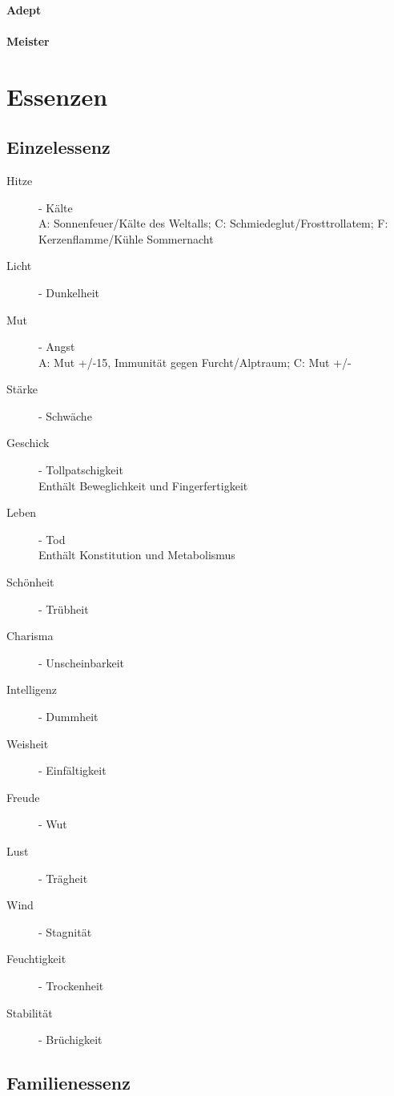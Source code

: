 \documentclass[a4paper,12pt,oneside]{book}
\begin{document}
\subsection{Adept}

\subsection{Meister}

\part{Essenzen}


\chapter{Einzelessenz}

\begin{description}
\item[Hitze] - Kälte
\\A: Sonnenfeuer/Kälte des Weltalls; C: Schmiedeglut/Frosttrollatem; F: Kerzenflamme/Kühle Sommernacht  
\item[Licht] - Dunkelheit
\item[Mut] - Angst
\\A: Mut +/-15, Immunität gegen Furcht/Alptraum; C: Mut +/-
\item[Stärke] - Schwäche
\item[Geschick] - Tollpatschigkeit
\\Enthält Beweglichkeit und Fingerfertigkeit
\item[Leben] - Tod 
\\Enthält Konstitution und Metabolismus
\item[Schönheit] - Trübheit
\item[Charisma] - Unscheinbarkeit
\item[Intelligenz] - Dummheit
\item[Weisheit] - Einfältigkeit

\item[Freude] - Wut
\item[Lust] - Trägheit

\item[Wind] - Stagnität 
\item[Feuchtigkeit] - Trockenheit
\item[Stabilität] - Brüchigkeit

\end{description}

\chapter{Familienessenz}
\end{document}
